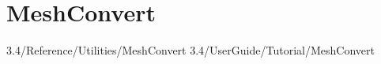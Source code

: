 \section{MeshConvert}
\label{s:utilities:meshconvert}
3.4/Reference/Utilities/MeshConvert
3.4/UserGuide/Tutorial/MeshConvert
